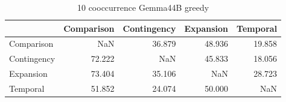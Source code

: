 \begin{table}
\caption{10 cooccurrence Gemma44B greedy}
\begin{tabular}{lrrrr}
\toprule
 & Comparison & Contingency & Expansion & Temporal \\
\midrule
Comparison & NaN & 36.879 & 48.936 & 19.858 \\
Contingency & 72.222 & NaN & 45.833 & 18.056 \\
Expansion & 73.404 & 35.106 & NaN & 28.723 \\
Temporal & 51.852 & 24.074 & 50.000 & NaN \\
\bottomrule
\end{tabular}
\end{table}
